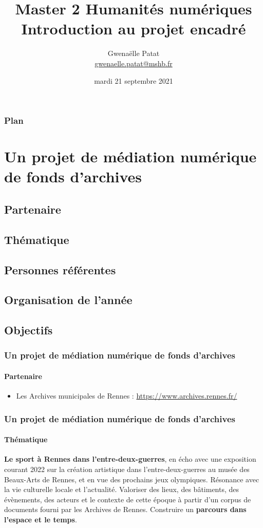 \documentclass[xcolor=table]{beamer}
\title{Master 2 Humanit\'es num\'eriques \\
Introduction au projet encadr\'e}
\author{Gwena\"elle Patat \\
\href{mailto:gwenaelle.patat@mshb.fr}{gwenaelle.patat@mshb.fr}}
\institute{\large{Maison des Sciences de l'Homme en Bretagne}}
\date{mardi 21 septembre 2021}
\begin{document}
\frame{\titlepage}

\begin{frame}[allowframebreaks]
\frametitle{Plan}
\tableofcontents
\end{frame}

\section{Un projet de m\'ediation num\'erique de fonds d'archives}
\subsection{Partenaire}
\subsection{Th\'ematique}
\subsection{Personnes r\'ef\'erentes}
\subsection{Organisation de l'ann\'ee}
\subsection{Objectifs}

\begin{frame}[plain]
\frametitle{Un projet de m\'ediation num\'erique de fonds d'archives}
\framesubtitle{Partenaire}
\begin{itemize}
    \item Les Archives municipales de Rennes : \url{https://www.archives.rennes.fr/}
\end{itemize}
\end{frame}

\begin{frame}[plain]
\frametitle{Un projet de m\'ediation num\'erique de fonds d'archives}
\framesubtitle{Th\'ematique}
\textbf{Le sport \`a Rennes dans l'entre-deux-guerres}, en \'echo avec une exposition courant 2022 sur la cr\'eation artistique dans l'entre-deux-guerres au mus\'ee des Beaux-Arts de Rennes, et en vue des prochains jeux olympiques. R\'esonance avec la vie culturelle locale et l'actualit\'e.
\newline
\newline
Valoriser des lieux, des b\^atiments, des \'ev\`enements, des acteurs et le contexte de cette \'epoque \`a partir d'un corpus de documents fourni par les Archives de Rennes. Construire un \textbf{parcours dans l'espace et le temps}.
\end{frame}
\end{document}
